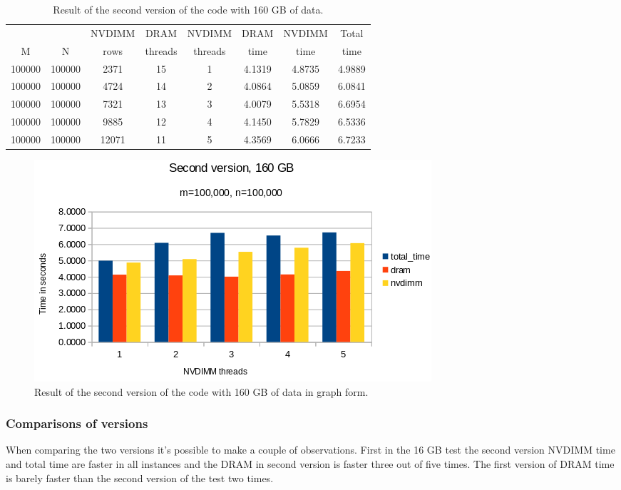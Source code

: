 \documentclass[12pt,a4paper,USenglish]{article}      %
\begin{document}
\begin{table}[!hbtp]
\centering
\begin{tabular}{ |c|c|c|c|c|c|c|c| }
\hline
&  & NVDIMM & DRAM & NVDIMM & DRAM & NVDIMM & Total \\
M & N & rows & threads & threads & time & time & time \\
\hline
100000 & 100000 & 2371 & 15 & 1 & 4.1319 & 4.8735 & 4.9889 \\
\hline
100000 & 100000 & 4724 & 14 & 2 & 4.0864 & 5.0859 & 6.0841 \\
\hline
100000 & 100000 & 7321 & 13 & 3 & 4.0079 & 5.5318 & 6.6954 \\
\hline
100000 & 100000 & 9885 & 12 & 4 & 4.1450 & 5.7829 & 6.5336 \\
\hline
100000 & 100000 & 12071 & 11 & 5 & 4.3569 & 6.0666 & 6.7233 \\
\hline
\end{tabular}
\caption{Result of the second version of the code with 160 GB of data.}
\label{tab:SecondVersion160GB}
\end{table}
\begin{figure}[!hbtp]
\includegraphics[scale=0.7]{Large_Array_test/Second_version_160GB.png}
\caption{Result of the second version of the code with 160 GB of data in graph form.}
\end{figure}

\subsubsection{Comparisons of versions}
When comparing the two versions it's possible to make a couple of observations. 
First in the 16 GB test the second version NVDIMM time and total time are faster in all instances and the DRAM in second version is faster three out of five times. The first version of DRAM time is barely faster than the second version of the test two times. 
\end{document}

